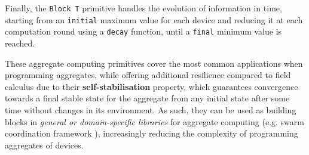 Finally, the \texttt{Block T} primitive handles the evolution of information in
time, starting from an \texttt{initial} maximum value for each device and
reducing it at each computation round using a \texttt{decay} function, until a
\texttt{final} minimum value is reached.

These aggregate computing primitives cover the most common applications when
programming aggregates, while offering additional resilience compared to field
calculus due to their \textbf{self-stabilisation} property, which guarantees
convergence towards a final stable state for the aggregate from any initial
state after some time without changes in its environment. As such, they can be
used as building blocks in \textit{general or domain-specific libraries} for
aggregate computing (e.g. swarm coordination framework \cite{MacroSwarm}),
increasingly reducing the complexity of programming aggregates of devices.